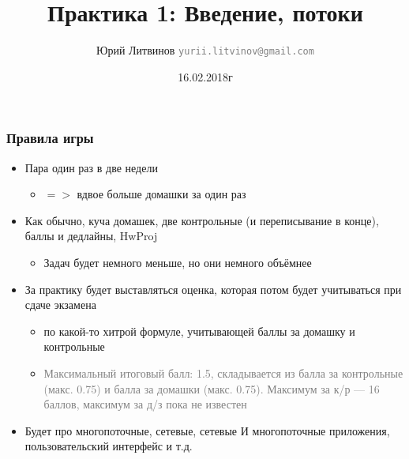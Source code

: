 \documentclass[xetex,mathserif,serif]{beamer}
\title{Практика 1: Введение, потоки}
\author[Юрий Литвинов]{Юрий Литвинов \newline \textcolor{gray}{\small\texttt{yurii.litvinov@gmail.com}}}
\date{16.02.2018г}
\begin{document}
	
	\frame{\titlepage}

	\begin{frame}
		\frametitle{Правила игры}
		\begin{itemize}
			\item Пара один раз в две недели
			\begin{itemize}
				\item $=>$ вдвое больше домашки за один раз
			\end{itemize}
			\item Как обычно, куча домашек, две контрольные (и переписывание в конце), баллы и дедлайны, HwProj
			\begin{itemize}
				\item Задач будет немного меньше, но они немного объёмнее
			\end{itemize}
			\item За практику будет выставляться оценка, которая потом будет учитываться при сдаче экзамена
			\begin{itemize}
				\item по какой-то хитрой формуле, учитывающей баллы за домашку и контрольные
				\item \textcolor{gray}{Максимальный итоговый балл: 1.5, складывается из балла за контрольные (макс. 0.75) и балла за домашки (макс. 0.75). Максимум за к/р --- 16 баллов, максимум за д/з пока не известен}
			\end{itemize}
			\item Будет про многопоточные, сетевые, сетевые И многопоточные приложения, пользовательский интерфейс и т.д.
		\end{itemize}
	\end{frame}
\end{document}
